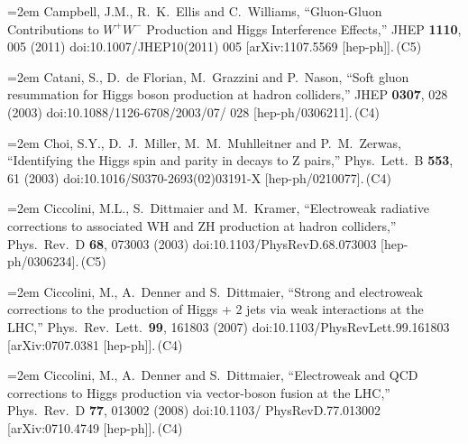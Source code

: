 \documentclass[letter,12pt]{article}
\def\xbibitem#1#2#3{\noindent\hangindent=2em #2\,(#3)}
\begin{document}
\xbibitem{Campbell:2011cu}{Campbell, J.M., R.~K.~Ellis and C.~Williams,
  ``Gluon-Gluon Contributions to $W^+ W^-$ Production and Higgs Interference Effects,''
  JHEP {\bf 1110}, 005 (2011)
  doi:10.1007/JHEP10(2011) 005
  [arXiv:1107.5569 [hep-ph]].}{C5}
  
\xbibitem{Catani:2003zt}{Catani, S., D.~de Florian, M.~Grazzini and P.~Nason,
  ``Soft gluon resummation for Higgs boson production at hadron colliders,''
  JHEP {\bf 0307}, 028 (2003)
  doi:10.1088/1126-6708/2003/07/ 028
  [hep-ph/0306211].}{C4}

\xbibitem{Choi:2002jk}{Choi, S.Y., D.~J.~Miller, M.~M.~Muhlleitner and P.~M.~Zerwas,
  ``Identifying the Higgs spin and parity in decays to Z pairs,''
  Phys.\ Lett.\ B {\bf 553}, 61 (2003)
  doi:10.1016/S0370-2693(02)03191-X
  [hep-ph/0210077].}{C4}
  
\xbibitem{Ciccolini:2003jy}{Ciccolini, M.L., S.~Dittmaier and M.~Kramer,
  ``Electroweak radiative corrections to associated WH and ZH production at hadron colliders,''
  Phys.\ Rev.\ D {\bf 68}, 073003 (2003)
  doi:10.1103/PhysRevD.68.073003
  [hep-ph/0306234].}{C5}

\xbibitem{Ciccolini:2007jr}{Ciccolini, M., A.~Denner and S.~Dittmaier,
  ``Strong and electroweak corrections to the production of Higgs + 2 jets via weak interactions at the LHC,''
  Phys.\ Rev.\ Lett.\  {\bf 99}, 161803 (2007)
  doi:10.1103/PhysRevLett.99.161803
  [arXiv:0707.0381 [hep-ph]].}{C4}
  
\xbibitem{Ciccolini:2007ec}{Ciccolini, M., A.~Denner and S.~Dittmaier,
  ``Electroweak and QCD corrections to Higgs production via vector-boson fusion at the LHC,''
  Phys.\ Rev.\ D {\bf 77}, 013002 (2008)
  doi:10.1103/ PhysRevD.77.013002
  [arXiv:0710.4749 [hep-ph]].}{C4}
\end{document}

